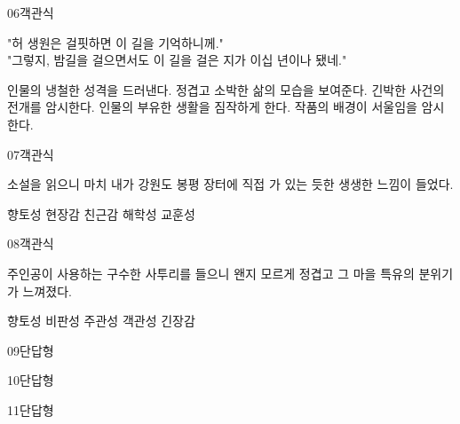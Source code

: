 \documentclass[fs9,seriesRus]{korfarm-base}
\begin{document}
\begin{kfQBlock}{06}{객관식}
\begin{kfEvidence}"허 생원은 걸핏하면 이 길을 기억하니께."   \\\relax
   "그렇지, 밤길을 걸으면서도 이 길을 걸은 지가 이십 년이나 됐네."\end{kfEvidence}
\begin{kfChoices}
\kfChoice 인물의 냉철한 성격을 드러낸다.
\kfChoice 정겹고 소박한 삶의 모습을 보여준다.
\kfChoice 긴박한 사건의 전개를 암시한다.
\kfChoice 인물의 부유한 생활을 짐작하게 한다.
\kfChoice 작품의 배경이 서울임을 암시한다.
\end{kfChoices}
\end{kfQBlock}
\begin{kfQBlock}{07}{객관식}
\begin{kfEvidence}소설을 읽으니 마치 내가 강원도 봉평 장터에 직접 가 있는 듯한 생생한 느낌이 들었다.\end{kfEvidence}
\begin{kfChoices}
\kfChoice 향토성
\kfChoice 현장감
\kfChoice 친근감
\kfChoice 해학성
\kfChoice 교훈성
\end{kfChoices}
\end{kfQBlock}
\begin{kfQBlock}{08}{객관식}
\begin{kfEvidence}주인공이 사용하는 구수한 사투리를 들으니 왠지 모르게 정겹고 그 마을 특유의 분위기가 느껴졌다.\end{kfEvidence}
\begin{kfChoices}
\kfChoice 향토성
\kfChoice 비판성
\kfChoice 주관성
\kfChoice 객관성
\kfChoice 긴장감
\end{kfChoices}
\end{kfQBlock}
\begin{kfQBlock}{09}{단답형}
\end{kfQBlock}
\begin{kfQBlock}{10}{단답형}
\end{kfQBlock}
\begin{kfQBlock}{11}{단답형}
\end{kfQBlock}
\end{document}
